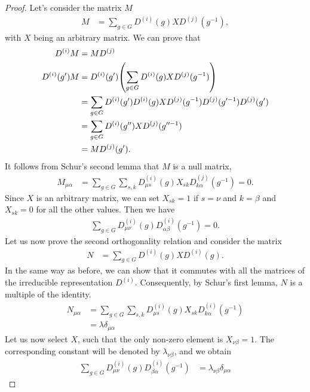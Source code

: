 \begin{proof}
    Let's consider the matrix $M$
    \begin{align}
        M&=\sum_{g\in G}D^{(i)}(g)XD^{(j)}(g^{-1}),
    \end{align}
    with $X$ being an arbitrary matrix. We can prove that
    \begin{align}
        D^{(i)}M&=MD^{(j)}\\
        D^{(i)}(g')M&=D^{(i)}(g')\qty(\sum_{g\in G}D^{(i)}(g)XD^{(j)}(g^{-1}))\\
                    &=\sum_{g\in G}D^{(i)}(g')D^{(i)}(g)XD^{(j)}(g^{-1})D^{(j)}
                    (g'^{-1})D^{(j)}(g')\\
                    &=\sum_{g\in G}D^{(i)}(g'')XD^{(j)}(g''^{-1})\\
                    &=MD^{(j)}(g').
    \end{align}
    It follows from Schur's second lemma that $M$ is a null matrix,
    \begin{align}
        M_{\mu\alpha}&=\sum_{g\in G}\sum_{s,k}D^{(i)}_{\mu s}(g)X_{sk}D^{(j)}_{k\alpha}(g^{-1})=0.
    \end{align}
    Since $X$ is an arbitrary matrix, we can set $X_{sk}=1$ if $s=\nu$ and
    $k=\beta$ and $X_{sk}=0$ for all the other values. Then we have
    \begin{align}
        \sum_{g\in G}D^{(i)}_{\mu\nu}(g)D^{(i)}_{\alpha\beta}(g^{-1})=0.
    \end{align}
    Let us now prove the second orthogonality relation and consider the matrix
    \begin{align}
        N&=\sum_{g\in G}D^{(i)}(g)XD^{(i)}(g).
    \end{align}
    In the same way as before, we can show that it commutes with all the matrices
    of the irreducible representation $D^{(i)}$. Consequently, by Schur's first
    lemma, $N$ is a multiple of the identity.
    \begin{align}
        N_{\mu\alpha}&=\sum_{g\in G}\sum_{s,k}D^{(i)}_{\mu s}(g)X_{sk}D^{(i)}_{k\alpha}(g^{-1})\\
                     &=\lambda\delta_{\mu\alpha}
    \end{align}
    Let us now select $X$, such that the only non-zero element is $X_{\nu\beta}=1$.
    The corresponding constant will be denoted by $\lambda_{\nu\beta}$, and we
    obtain
    \begin{align}
        \sum_{g\in G}D^{(i)}_{\mu\nu}(g)D^{(i)}_{\beta\alpha}(g^{-1})&=\lambda_{\nu\beta}\delta_{\mu\alpha}

\end{align}
\end{proof}
